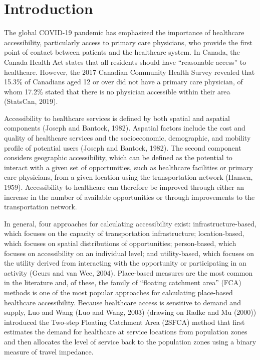 \documentclass[]{elsarticle} %
\begin{document}
\hypertarget{introduction}{%
\section{Introduction}\label{introduction}}

The global COVID-19 pandemic has emphasized the importance of healthcare
accessibility, particularly access to primary care physicians, who
provide the first point of contact between patients and the healthcare
system. In Canada, the Canada Health Act states that all residents
should have ``reasonable access'' to healthcare. However, the 2017
Canadian Community Health Survey revealed that 15.3\% of Canadians aged
12 or over did not have a primary care physician, of whom 17.2\% stated
that there is no physician accessible within their area (StatsCan,
2019).

Accessibility to healthcare services is defined by both spatial and
aspatial components (Joseph and Bantock, 1982). Aspatial factors include
the cost and quality of healthcare services and the socioeconomic,
demographic, and mobility profile of potential users (Joseph and
Bantock, 1982). The second component considers geographic accessibility,
which can be defined as the potential to interact with a given set of
opportunities, such as healthcare facilities or primary care physicians,
from a given location using the transportation network (Hansen, 1959).
Accessibility to healthcare can therefore be improved through either an
increase in the number of available opportunities or through
improvements to the transportation network.

In general, four approaches for calculating accessibility exist:
infrastructure-based, which focuses on the capacity of transportation
infrastructure; location-based, which focuses on spatial distributions
of opportunities; person-based, which focuses on accessibility on an
individual level; and utility-based, which focuses on the utility
derived from interacting with the opportunity or participating in an
activity (Geurs and van Wee, 2004). Place-based measures are the most
common in the literature and, of these, the family of ``floating
catchment area'' (FCA) methods is one of the most popular approaches for
calculating place-based healthcare accessibility. Because healthcare
access is sensitive to demand and supply, Luo and Wang (Luo and Wang,
2003) (drawing on Radke and Mu (2000)) introduced the Two-step Floating
Catchment Area (2SFCA) method that first estimates the demand for
healthcare at service locations from population zones and then allocates
the level of service back to the population zones using a binary measure
of travel impedance.
\end{document}
